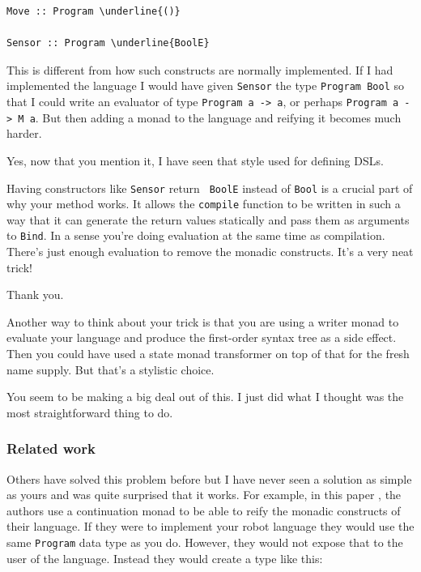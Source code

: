 \begin{small}
\begin{Verbatim}[commandchars=\\\{\}] 
Move :: Program \underline{()}
  
Sensor :: Program \underline{BoolE}
\end{Verbatim}
\end{small}

\begin{dialogue}
\speak{\docname{}} This is different from how such constructs are
normally implemented. If I had implemented the language I would have
given {\tt Sensor} the type {\tt Program Bool} so that I could write
an evaluator of type {\tt Program a -> a}, or perhaps {\tt Program a -> M a}.
But then adding a monad to the language and reifying it becomes much harder.

\speak{\studname{}} Yes, now that you mention it, I have seen that style used
for defining DSLs.

\speak{\docname{}} Having constructors like {\tt Sensor} return {\tt
  BoolE} instead of {\tt Bool} is a crucial part of why your
method works. It allows the {\tt compile} function to be written in
such a way that it can generate the return values statically and pass
them as arguments to {\tt Bind}. In a sense you're doing evaluation at
the same time as compilation. There's just enough evaluation to
remove the monadic constructs. It's a very neat trick!

\speak{\studname{}} Thank you.

\speak{\docname{}} Another way to think about your trick is that you are
using a writer monad to evaluate your language and produce the first-order
syntax tree as a side effect. Then you could have used a state monad
transformer on top of that for the fresh name supply. But that's a stylistic
choice.

\speak{\studname{}} You seem to be making a big deal out of this. I
just did what I thought was the most straightforward thing to do.

\end{dialogue}

\subsubsection{Related work} 

\begin{dialogue}

\speak{\docname{}} Others have solved this problem before but I have
never seen a solution as simple as yours and was quite surprised that
it works. For example, in this paper , the authors use a
continuation monad to be able to reify the monadic constructs of their
language. If they were to implement your robot language they would use
the same \texttt{Program} data type as you do. However, they would not
expose that to the user of the language. Instead they would create a
type like this:

\end{dialogue}

